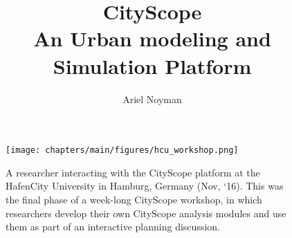 \documentclass[11pt,twoside]{style/mitthesis}
\begin{document}
\makeatletter
\renewcommand{\thesection}{%
    \ifnum\c@chapter<1 \@arabic\c@section
    \else \thechapter.\@arabic\c@section
    \fi
}
\makeatother

\makeatletter
\renewcommand*{\thetable}{\arabic{table}}
\renewcommand*{\thefigure}{\arabic{figure}}
\let\c@table\c@figure
\makeatother
\title{%
    \Huge CityScope\\
    \Large {
        An Urban modeling and Simulation Platform
    }
}
\author{Ariel Noyman}
\maketitle
\setcounter{savepage}{\thepage}
\setcounter{secnumdepth}{5}
\setcounter{tocdepth}{5}
\begin{abstractpage}
    
\end{abstractpage}

\begin{commiteepage}
    
\end{commiteepage}

\newpage
\tableofcontents
\clearpage
\pagestyle{plain}

\begin{figure}[!htb]
    \begin{center}
        \texttt{[image: chapters/main/figures/hcu\_workshop.png]}
    \end{center}
    \caption{
        A researcher interacting with the CityScope platform at the HafenCity University in Hamburg, Germany (Nov, `16). This was the final phase of a week-long CityScope workshop, in which researchers develop their own CityScope analysis modules and use them as part of an interactive planning discussion.
    }
    \label{fig:hcu_workshop}
\end{figure}
\newpage
\end{document}
